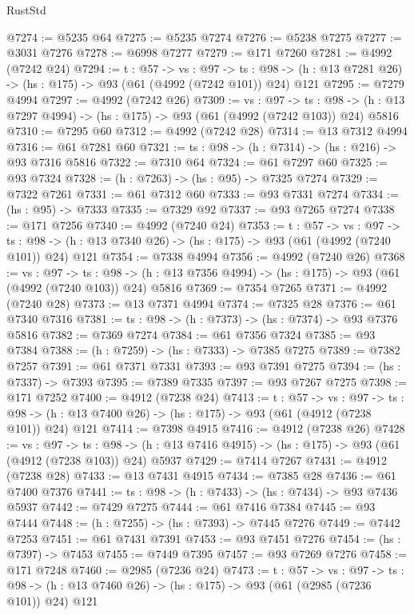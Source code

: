 \begin{lexlean}{RustStd}
\begin{coremodule}
@7274 := @5235 @64
@7275 := @5235 @7274
@7276 := @5238 @7275
@7277 := @3031 @7276
@7278 := @6998 @7277
@7279 := @171 @7260
@7281 := @4992 (@7242 @24)
@7294 := {t : @57} ->
  {vs : @97} ->
  {ts : @98} -> (h : @13 @7281 @26) -> (hs : @175) -> @93 (@61 (@4992 (@7242 @101)) @24) @121
@7295 := @7279 @4994
@7297 := @4992 (@7242 @26)
@7309 := {vs : @97} ->
  {ts : @98} -> (h : @13 @7297 @4994) -> (hs : @175) -> @93 (@61 (@4992 (@7242 @103)) @24) @5816
@7310 := @7295 @60
@7312 := @4992 (@7242 @28)
@7314 := @13 @7312 @4994
@7316 := @61 @7281 @60
@7321 := {ts : @98} -> (h : @7314) -> (hs : @216) -> @93 @7316 @5816
@7322 := @7310 @64
@7324 := @61 @7297 @60
@7325 := @93 @7324
@7328 := (h : @7263) -> (hs : @95) -> @7325 @7274
@7329 := @7322 @7261
@7331 := @61 @7312 @60
@7333 := @93 @7331 @7274
@7334 := (hs : @95) -> @7333
@7335 := @7329 @92
@7337 := @93 @7265 @7274
@7338 := @171 @7256
@7340 := @4992 (@7240 @24)
@7353 := {t : @57} ->
  {vs : @97} ->
  {ts : @98} -> (h : @13 @7340 @26) -> (hs : @175) -> @93 (@61 (@4992 (@7240 @101)) @24) @121
@7354 := @7338 @4994
@7356 := @4992 (@7240 @26)
@7368 := {vs : @97} ->
  {ts : @98} -> (h : @13 @7356 @4994) -> (hs : @175) -> @93 (@61 (@4992 (@7240 @103)) @24) @5816
@7369 := @7354 @7265
@7371 := @4992 (@7240 @28)
@7373 := @13 @7371 @4994
@7374 := @7325 @28
@7376 := @61 @7340 @7316
@7381 := {ts : @98} -> (h : @7373) -> (hs : @7374) -> @93 @7376 @5816
@7382 := @7369 @7274
@7384 := @61 @7356 @7324
@7385 := @93 @7384
@7388 := (h : @7259) -> (hs : @7333) -> @7385 @7275
@7389 := @7382 @7257
@7391 := @61 @7371 @7331
@7393 := @93 @7391 @7275
@7394 := (hs : @7337) -> @7393
@7395 := @7389 @7335
@7397 := @93 @7267 @7275
@7398 := @171 @7252
@7400 := @4912 (@7238 @24)
@7413 := {t : @57} ->
  {vs : @97} ->
  {ts : @98} -> (h : @13 @7400 @26) -> (hs : @175) -> @93 (@61 (@4912 (@7238 @101)) @24) @121
@7414 := @7398 @4915
@7416 := @4912 (@7238 @26)
@7428 := {vs : @97} ->
  {ts : @98} -> (h : @13 @7416 @4915) -> (hs : @175) -> @93 (@61 (@4912 (@7238 @103)) @24) @5937
@7429 := @7414 @7267
@7431 := @4912 (@7238 @28)
@7433 := @13 @7431 @4915
@7434 := @7385 @28
@7436 := @61 @7400 @7376
@7441 := {ts : @98} -> (h : @7433) -> (hs : @7434) -> @93 @7436 @5937
@7442 := @7429 @7275
@7444 := @61 @7416 @7384
@7445 := @93 @7444
@7448 := (h : @7255) -> (hs : @7393) -> @7445 @7276
@7449 := @7442 @7253
@7451 := @61 @7431 @7391
@7453 := @93 @7451 @7276
@7454 := (hs : @7397) -> @7453
@7455 := @7449 @7395
@7457 := @93 @7269 @7276
@7458 := @171 @7248
@7460 := @2985 (@7236 @24)
@7473 := {t : @57} ->
  {vs : @97} ->
  {ts : @98} -> (h : @13 @7460 @26) -> (hs : @175) -> @93 (@61 (@2985 (@7236 @101)) @24) @121

\end{coremodule}
\end{lexlean}
